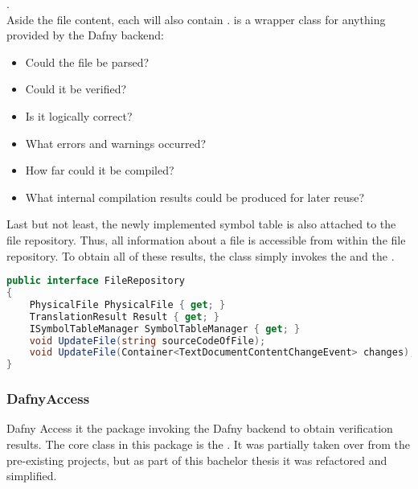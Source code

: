 .\\

Aside the file content, each  will also contain .
 is a wrapper class for anything provided by the Dafny backend:
\begin{itemize}
    \item Could the file be parsed?
    \item Could it be verified?
    \item Is it logically correct?
    \item What errors and warnings occurred?
    \item How far could it be compiled?
    \item What internal compilation results could be produced for later reuse?
\end{itemize}

Last but not least, the newly implemented symbol table is also attached to the file repository.
Thus, all information about a file is accessible from within the file repository.
To obtain all of these results, the class simply invokes the  and the .

\begin{lstlisting}[language=csharp, caption={Handling Compilation}, captionpos=b, label={lst:handlecompilation}]
public interface FileRepository
{
    PhysicalFile PhysicalFile { get; }
    TranslationResult Result { get; }
    ISymbolTableManager SymbolTableManager { get; }
    void UpdateFile(string sourceCodeOfFile);
    void UpdateFile(Container<TextDocumentContentChangeEvent> changes);
}
\end{lstlisting}


\subsubsection{DafnyAccess}
Dafny Access it the package invoking the Dafny backend to obtain verification results.
The core class in this package is the .
It was partially taken over from the pre-existing projects, but as part of this bachelor thesis it was refactored and simplified.\\

